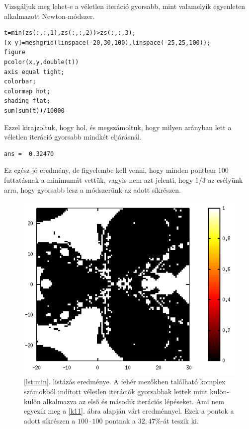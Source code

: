 \documentclass[a4paper,12pt]{report}
\begin{document}
				Vizsgáljuk meg lehet-e a véletlen iteráció gyorsabb, mint valamelyik egyenleten alkalmazott Newton-módszer.
				\begin{singlespace}
                \begin{lstlisting}[caption=Bemenet,label=lst:min]
t=min(zs(:,:,1),zs(:,:,2))>zs(:,:,3);
[x y]=meshgrid(linspace(-20,30,100),linspace(-25,25,100));
figure
pcolor(x,y,double(t))
axis equal tight;
colorbar;
colormap hot;
shading flat;
sum(sum(t))/10000
				\end{lstlisting}
                \end{singlespace}
				Ezzel kirajzoltuk, hogy hol, és megszámoltuk, hogy milyen arányban lett a véletlen iteráció gyorsabb mindkét eljárásnál. 
				\begin{singlespace}
                \begin{lstlisting}[caption= Eredm\'eny]
ans =  0.32470
				\end{lstlisting}
                \end{singlespace}
				Ez egész jó eredmény, de figyelembe kell venni, hogy minden pontban 100 futtatásnak a minimumát vettük, vagyis nem azt jelenti, hogy 1/3 az esélyünk arra, hogy gyorsabb lesz a módszerünk az adott síkrészen.
				
				\begin{figure}[h]
					\centering
					\includegraphics[scale=0.35]{min.png}
					\caption{\ref{lst:min}. listázás eredménye. A fehér mezőkben található komplex számokból indított véletlen iterációk gyorsabbak lettek mint külön-külön alkalmazva az első és második iterációs lépéseket. Ami nem egyezik meg a \ref{k11}. ábra alapján várt eredménnyel. Ezek a pontok a adott síkrészen a $100\cdot100$ pontnak a $32,\!47\%$-át teszik ki.}
				\end{figure}
\end{document}
